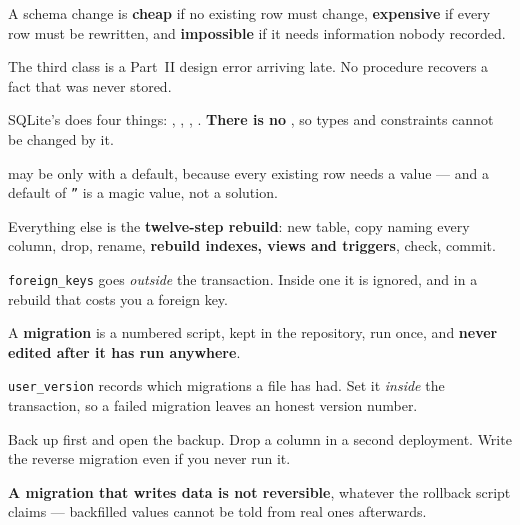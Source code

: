 \begin{chaptersummary}
\begin{tight}
  \item A schema change is \textbf{cheap} if no existing row must change,
        \textbf{expensive} if every row must be rewritten, and
        \textbf{impossible} if it needs information nobody recorded.
  \item The third class is a Part~II design error arriving late. No procedure
        recovers a fact that was never stored.
  \item SQLite's  does four things: ,
        , , .
        \textbf{There is no }, so types and constraints
        cannot be changed by it.
  \item {} may be  only with a default,
        because every existing row needs a value --- and a default of
        \texttt{''} is a magic value, not a solution.
  \item Everything else is the \textbf{twelve-step rebuild}: new table, copy
        naming every column, drop, rename, \textbf{rebuild indexes, views and
        triggers}, check, commit.
  \item {} \texttt{foreign\_keys} goes \emph{outside} the
        transaction. Inside one it is ignored, and in a rebuild that costs you
        a foreign key.
  \item A \textbf{migration} is a numbered script, kept in the repository, run
        once, and \textbf{never edited after it has run anywhere}.
  \item {} \texttt{user\_version} records which migrations a file
        has had. Set it \emph{inside} the transaction, so a failed migration
        leaves an honest version number.
  \item Back up first and open the backup. Drop a column in a second
        deployment. Write the reverse migration even if you never run it.
  \item \textbf{A migration that writes data is not reversible}, whatever the
        rollback script claims --- backfilled values cannot be told from real
        ones afterwards.
\end{tight}
\end{chaptersummary}

